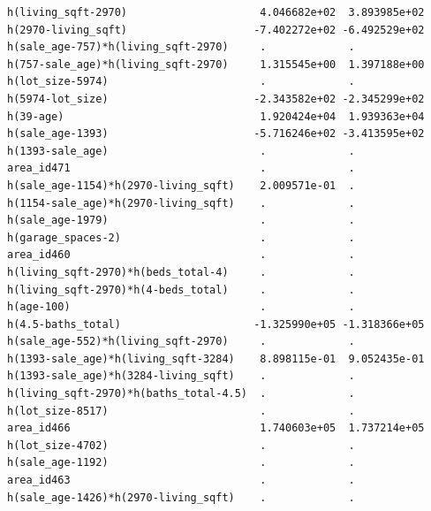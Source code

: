 \documentclass[
]{article}
\begin{document}
\begin{verbatim}
h(living_sqft-2970)                     4.046682e+02  3.893985e+02
h(2970-living_sqft)                    -7.402272e+02 -6.492529e+02
h(sale_age-757)*h(living_sqft-2970)     .             .           
h(757-sale_age)*h(living_sqft-2970)     1.315545e+00  1.397188e+00
h(lot_size-5974)                        .             .           
h(5974-lot_size)                       -2.343582e+02 -2.345299e+02
h(39-age)                               1.920424e+04  1.939363e+04
h(sale_age-1393)                       -5.716246e+02 -3.413595e+02
h(1393-sale_age)                        .             .           
area_id471                              .             .           
h(sale_age-1154)*h(2970-living_sqft)    2.009571e-01  .           
h(1154-sale_age)*h(2970-living_sqft)    .             .           
h(sale_age-1979)                        .             .           
h(garage_spaces-2)                      .             .           
area_id460                              .             .           
h(living_sqft-2970)*h(beds_total-4)     .             .           
h(living_sqft-2970)*h(4-beds_total)     .             .           
h(age-100)                              .             .           
h(4.5-baths_total)                     -1.325990e+05 -1.318366e+05
h(sale_age-552)*h(living_sqft-2970)     .             .           
h(1393-sale_age)*h(living_sqft-3284)    8.898115e-01  9.052435e-01
h(1393-sale_age)*h(3284-living_sqft)    .             .           
h(living_sqft-2970)*h(baths_total-4.5)  .             .           
h(lot_size-8517)                        .             .           
area_id466                              1.740603e+05  1.737214e+05
h(lot_size-4702)                        .             .           
h(sale_age-1192)                        .             .           
area_id463                              .             .           
h(sale_age-1426)*h(2970-living_sqft)    .             .           
                                                                  

\end{verbatim}
\end{document}
